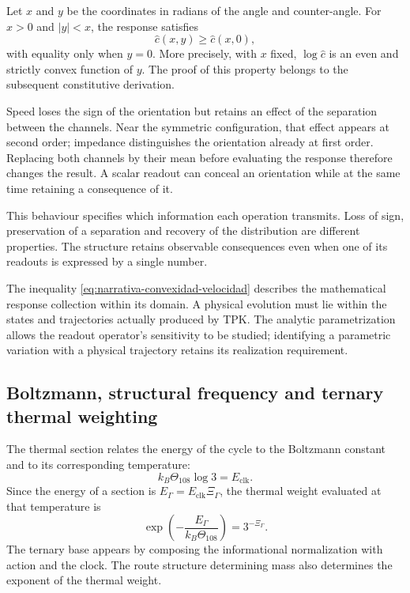 Let $x$ and $y$ be the coordinates in radians of the angle and counter-angle.
For $x>0$ and $|y|<x$, the response satisfies
\begin{equation}
 \widehat c(x,y)\geq\widehat c(x,0),
 \label{eq:narrativa-convexidad-velocidad}
\end{equation}
with equality only when $y=0$. More precisely, with $x$
fixed, $\log\widehat c$ is an even and strictly convex function of $y$.
The proof of this property belongs to the subsequent constitutive
derivation.

Speed loses the sign of the orientation but retains an effect
of the separation between the channels. Near the symmetric configuration,
that effect appears at second order; impedance distinguishes the orientation
already at first order. Replacing both channels by their mean before
evaluating the response therefore changes the result. A scalar readout can conceal
an orientation while at the same time retaining a consequence of it.

This behaviour specifies which information each operation transmits.
Loss of sign, preservation of a separation and recovery
of the distribution are different properties. The structure retains
observable consequences even when one of its readouts is expressed
by a single number.

The inequality \eqref{eq:narrativa-convexidad-velocidad} describes the
mathematical response collection within its domain. A physical evolution must lie
within the states and trajectories actually produced by TPK. The
analytic parametrization allows the readout operator's sensitivity to be studied;
identifying a parametric variation with a physical trajectory
retains its realization requirement.

\subsection{Boltzmann, structural frequency and ternary thermal weighting}
\label{subsec:narrativa-boltzmann}

The thermal section relates the energy of the cycle to the Boltzmann
constant and to its corresponding temperature:
\begin{equation}
 k_B\Theta_{108}\log3=E_{\mathrm{clk}}.
 \label{eq:narrativa-boltzmann-ciclo}
\end{equation}
Since the energy of a section is
$E_\Gamma=E_{\mathrm{clk}}\Xi_\Gamma$, the thermal weight evaluated at that
temperature is
\begin{equation}
 \boxed{\exp\!\left(-\frac{E_\Gamma}{k_B\Theta_{108}}\right)
       =3^{-\Xi_\Gamma}.}
 \label{eq:narrativa-peso-termico}
\end{equation}
The ternary base appears by composing the informational normalization
with action and the clock. The route structure determining mass
also determines the exponent of the thermal weight.

